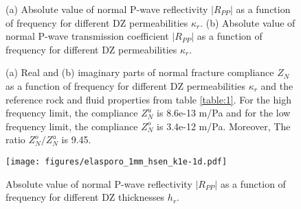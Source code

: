 \documentclass[draft,jgrga]{agutexSI2019}
\begin{document}
 \begin{figure}[!ht]
\centering
        
\caption {(a) Absolute value of normal P-wave reflectivity $|R_{PP}|$ as a function of frequency for different DZ permeabilities $\kappa_r$. (b)  Absolute value of normal P-wave transmission coefficient  $|R_{PP}|$ as a function of frequency for different DZ permeabilities $\kappa_r$.}
\label{fig:3}
\end{figure}


\begin{figure}[hp]
\centering
\caption {(a) Real and (b) imaginary parts of normal fracture compliance $Z_N$ as a function of frequency for different DZ permeabilities $\kappa_r$ and the reference rock and fluid properties from table \ref{table:1}. For the high frequency limit, the compliance $Z_N^u$ is 8.6e-13 m/Pa and for the low frequency limit, the compliance $Z_N^o$ is 3.4e-12 m/Pa. Moreover, The ratio $Z_N^o/Z_N^u$ is 9.45. } 
\label{fig:4}
\end{figure}

\begin{figure}[hp]
\centering
        \texttt{[image: figures/elasporo\_1mm\_hsen\_k1e-1d.pdf]}

\caption {Absolute value of normal P-wave reflectivity $|R_{PP}|$ as a function of frequency for different DZ thicknesses $h_r$.}
\label{fig:5}
\end{figure}
\end{document}
